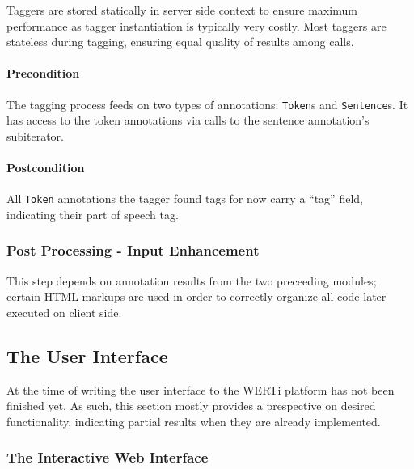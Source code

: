 \documentclass[12pt]{article}
\begin{document}
Taggers are stored statically in server side context to ensure maximum
performance as tagger instantiation is typically very costly. Most taggers
are stateless during tagging, ensuring equal quality of results among calls.

\paragraph{Precondition} The tagging process feeds on two types of annotations:
\verb'Token's and \verb'Sentence's. It has access to the token annotations via
calls to the sentence annotation's subiterator.

\paragraph{Postcondition} All \verb'Token' annotations the tagger found tags for
now carry a ``tag'' field, indicating their part of speech tag.

\subsubsection{Post Processing - Input Enhancement}

This step depends on
  annotation results from the two preceeding modules; certain HTML markups are
  used in order to correctly organize all code later executed on client side. 

\subsection{The User Interface}

At the time of writing the user interface to the WERTi platform has not been
finished yet. As such, this section mostly provides a prespective on desired
functionality, indicating partial results when they are already implemented.

\subsubsection{The Interactive Web Interface}
\end{document}
